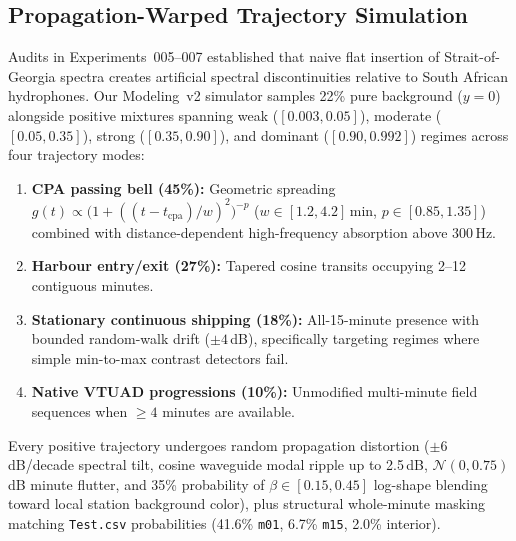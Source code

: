 \documentclass[10pt,a4paper]{article}
\begin{document}
\subsection{Propagation-Warped Trajectory Simulation}
Audits in Experiments~005--007 established that naive flat insertion of Strait-of-Georgia spectra creates artificial spectral discontinuities relative to South African hydrophones. Our Modeling~v2 simulator samples 22\% pure background ($y=0$) alongside positive mixtures spanning weak ($[0.003, 0.05]$), moderate ($[0.05, 0.35]$), strong ($[0.35, 0.90]$), and dominant ($[0.90, 0.992]$) regimes across four trajectory modes:
\begin{enumerate}
    \item \textbf{CPA passing bell (45\%):} Geometric spreading $g(t) \propto \big(1 + ((t-t_{\mathrm{cpa}})/w)^2\big)^{-p}$ ($w \in [1.2,4.2]$\,min, $p \in [0.85,1.35]$) combined with distance-dependent high-frequency absorption above 300\,Hz.
    \item \textbf{Harbour entry/exit (27\%):} Tapered cosine transits occupying 2--12 contiguous minutes.
    \item \textbf{Stationary continuous shipping (18\%):} All-15-minute presence with bounded random-walk drift ($\pm 4$\,dB), specifically targeting regimes where simple min-to-max contrast detectors fail.
    \item \textbf{Native VTUAD progressions (10\%):} Unmodified multi-minute field sequences when $\ge 4$ minutes are available.
\end{enumerate}
Every positive trajectory undergoes random propagation distortion ($\pm 6$\,dB/decade spectral tilt, cosine waveguide modal ripple up to 2.5\,dB, $\mathcal{N}(0,0.75)$\,dB minute flutter, and 35\% probability of $\beta \in [0.15,0.45]$ log-shape blending toward local station background color), plus structural whole-minute masking matching \texttt{Test.csv} probabilities (41.6\% \texttt{m01}, 6.7\% \texttt{m15}, 2.0\% interior).
\end{document}
